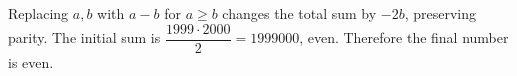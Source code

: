 Replacing $a,b$ with $a-b$ for $a\ge b$ changes the total sum by $-2b$, preserving parity. The initial sum is $\dfrac{1999\cdot2000}{2}=1999000$, even. Therefore the final number is even.
